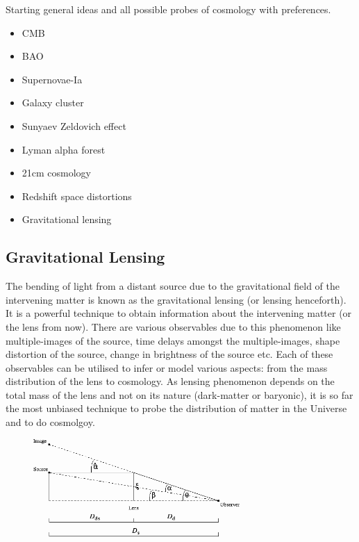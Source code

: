 Starting general ideas and all possible probes of cosmology with preferences.
\begin{itemize}
	\item CMB
	\item BAO
	\item Supernovae-Ia
	\item Galaxy cluster
	\item Sunyaev Zeldovich effect
	\item Lyman alpha forest
	\item 21cm cosmology
	\item Redshift space distortions
	\item Gravitational lensing
\end{itemize}



\subsection{Gravitational Lensing}
The bending of light from a distant source due to the gravitational field of the
intervening matter is known as
the gravitational lensing (or lensing henceforth). It is a powerful technique to 
obtain information about the intervening matter (or the lens from now). There are
various observables due to this phenomenon like multiple-images of the source, time 
delays amongst the multiple-images, shape distortion of the source, change in brightness
of the source etc. Each of these observables can be utilised to infer or model various
aspects: from the mass distribution of the lens to cosmology. As lensing phenomenon depends 
on the total mass of the lens and not on its nature (dark-matter or baryonic), it is
so far the most unbiased technique to probe the distribution of matter in the Universe
and to do cosmolgoy.

\begin{figure}
	\centering
	\includegraphics[width=0.7\textwidth]{figures/lens_geometry.png}
	\caption{}
	\label{fig:lens}
\end{figure}

